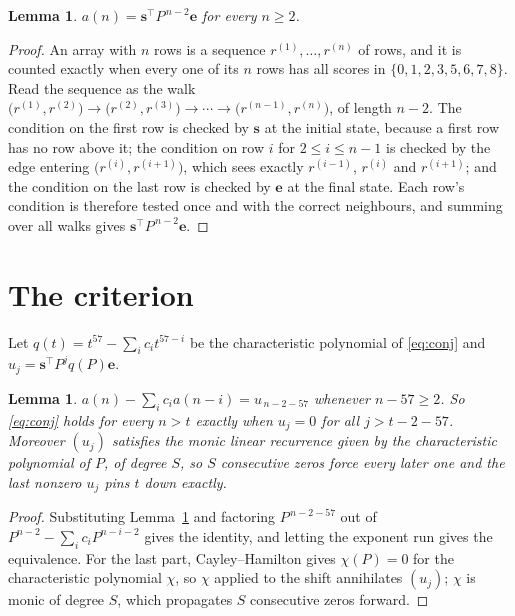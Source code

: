 \documentclass[11pt,a4paper]{article}
\theoremstyle{plain}
\newtheorem{lemma}[theorem]{Lemma}
\theoremstyle{definition}
\begin{document}
\begin{lemma}\label{lem:walk}
$a(n)=\mathbf{s}^{\!\top}P^{\,n-2}\mathbf{e}$ for every $n\ge2$.
\end{lemma}

\begin{proof}
An array with $n$ rows is a sequence $r^{(1)},\dots,r^{(n)}$ of rows, and it is counted
exactly when every one of its $n$ rows has all scores in $\{0,1,2,3,5,6,7,8\}$. Read the sequence as the
walk $\bigl(r^{(1)},r^{(2)}\bigr)\to\bigl(r^{(2)},r^{(3)}\bigr)\to\cdots\to
\bigl(r^{(n-1)},r^{(n)}\bigr)$, of length $n-2$. The condition on the first row is
checked by $\mathbf{s}$ at the initial state, because a first row has no row above it; the
condition on row $i$ for $2\le i\le n-1$ is checked by the edge entering
$\bigl(r^{(i)},r^{(i+1)}\bigr)$, which sees exactly $r^{(i-1)}$, $r^{(i)}$ and
$r^{(i+1)}$; and the condition on the last row is checked by $\mathbf{e}$ at the final
state. Each row's condition is therefore tested once and with the correct neighbours, and
summing over all walks gives $\mathbf{s}^{\!\top}P^{\,n-2}\mathbf{e}$.
\end{proof}

\section{The criterion}

Let $q(t)=t^{57}-\sum_i c_i t^{57-i}$ be the characteristic polynomial of
\eqref{eq:conj} and $u_j=\mathbf{s}^{\!\top}P^{j}q(P)\mathbf{e}$.

\begin{lemma}\label{lem:crit}
$a(n)-\sum_i c_i a(n-i)=u_{\,n-2-57}$ whenever $n-57\ge2$. So \eqref{eq:conj}
holds for every $n>t$ exactly when $u_j=0$ for all $j>t-2-57$. Moreover $(u_j)$
satisfies the monic linear recurrence given by the characteristic polynomial of $P$, of
degree $S$, so $S$ consecutive zeros force every later one and the last nonzero $u_j$ pins
$t$ down exactly.
\end{lemma}

\begin{proof}
Substituting Lemma~\ref{lem:walk} and factoring $P^{\,n-2-57}$ out of
$P^{n-2}-\sum_i c_i P^{n-i-2}$ gives the identity, and letting the exponent run gives the
equivalence. For the last part, Cayley--Hamilton gives $\chi(P)=0$ for the characteristic
polynomial $\chi$, so $\chi$ applied to the shift annihilates $(u_j)$; $\chi$ is monic of
degree $S$, which propagates $S$ consecutive zeros forward.
\end{proof}
\end{document}
